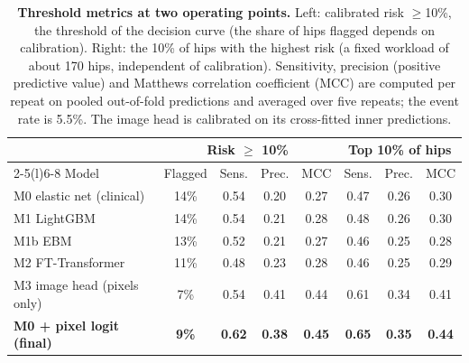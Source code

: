 \begin{table}[!tbp]
  \centering
  \caption{\textbf{Threshold metrics at two operating points.} Left: calibrated risk $\ge$10\%, the threshold of the
  decision curve (the share of hips flagged depends on calibration). Right: the 10\% of hips with the highest risk (a
  fixed workload of about 170 hips, independent of calibration). Sensitivity, precision (positive predictive value) and
  Matthews correlation coefficient (MCC) are computed per repeat on pooled out-of-fold predictions and averaged over five
  repeats; the event rate is 5.5\%. The image head is calibrated on its cross-fitted inner predictions.}
  \label{tab:threshold}
  \small
  \setlength{\tabcolsep}{4pt}
  \begin{tabular}{@{}lccccccc@{}}
    \toprule
    & \multicolumn{4}{c}{Risk $\ge$ 10\%} & \multicolumn{3}{c}{Top 10\% of hips} \\
    \cmidrule(lr){2-5}\cmidrule(l){6-8}
    Model & Flagged & Sens. & Prec. & MCC & Sens. & Prec. & MCC \\
    \midrule
    M0 elastic net (clinical) & 14\% & 0.54 & 0.20 & 0.27 & 0.47 & 0.26 & 0.30 \\
    M1 LightGBM & 14\% & 0.54 & 0.21 & 0.28 & 0.48 & 0.26 & 0.30 \\
    M1b EBM & 13\% & 0.52 & 0.21 & 0.27 & 0.46 & 0.25 & 0.28 \\
    M2 FT-Transformer & 11\% & 0.48 & 0.23 & 0.28 & 0.46 & 0.25 & 0.29 \\
    M3 image head (pixels only) & 7\% & 0.54 & 0.41 & 0.44 & 0.61 & 0.34 & 0.41 \\
    \textbf{M0 + pixel logit (final)} & \textbf{9\%} & \textbf{0.62} & \textbf{0.38} & \textbf{0.45} & \textbf{0.65} & \textbf{0.35} & \textbf{0.44} \\
    \bottomrule
  \end{tabular}
\end{table}

